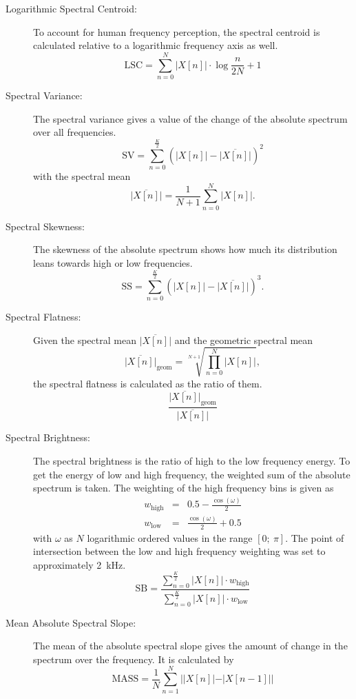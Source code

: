 \begin{description}
    \item[Logarithmic Spectral Centroid:]
        To account for human frequency perception, the spectral centroid is calculated relative to a logarithmic frequency axis as well.
        \[
            \mathrm{LSC} = \sum_{n=0}^{N}{|X[n]| \cdot \log{\frac{n}{2 N}+1}}
        \]
    \item[Spectral Variance:]
        The spectral variance gives a value of the change of the absolute spectrum over all frequencies.
        \[
            \mathrm{SV} = \sum_{n=0}^{\frac{K}{2}}{(|X[n]|-\overline{|X[n]|})^2}
        \]
        with the spectral mean
        \[
            \overline{|X[n]|} = \frac{1}{N+1}\sum_{n=0}^{N}{|X[n]|}.
        \]
    \item[Spectral Skewness:]
    		The skewness of the absolute spectrum shows how much its distribution leans towards high or low frequencies.
        \[
            \mathrm{SS} = \sum_{n=0}^{\frac{K}{2}}{(|X[n]|-\overline{|X[n]|})^3}.
        \]
    \item[Spectral Flatness:]
        Given the spectral mean $\overline{|X[n]|}$ and the geometric spectral mean
        \[
            \overline{|X[n]|}_\mathrm{geom} = \sqrt[N+1]{\prod_{n=0}^{N}{|X[n]|}},
        \]
        the spectral flatness is calculated as the ratio of them.
        \[
        		\frac{\overline{|X[n]|}_\mathrm{geom}}{\overline{|X[n]|}}
        \]
    \item[Spectral Brightness:]
        The spectral brightness is the ratio of high to the low frequency energy. To get the energy of low and high frequency, the weighted sum of the absolute spectrum is taken. The weighting of the high frequency bins is given as
        \begin{eqnarray*}
            w_\mathrm{high} &=& 0.5 - \frac{\cos(\omega)}{2}\\
            w_\mathrm{low} &=& \frac{\cos(\omega)}{2} + 0.5
        \end{eqnarray*}
        with $\omega$ as $N$ logarithmic ordered values in the range $[0;~\pi]$. The point of intersection between the low and high frequency weighting was set to approximately 2~kHz.
        \[
            \mathrm{SB} = \frac{\sum_{n=0}^{\frac{K}{2}}{|X[n]|\cdot w_\mathrm{high}}}{\sum_{n=0}^{\frac{K}{2}}{|X[n]|\cdot w_\mathrm{low} }}
        \]
    \item[Mean Absolute Spectral Slope:]
        The mean of the absolute spectral slope gives the amount of change in the spectrum over the frequency. It is calculated by
        \[
            \mathrm{MASS} = \frac{1}{N}\sum_{n=1}^{N}{||X[n]|-|X[n-1]||}
        \]
\end{description}
